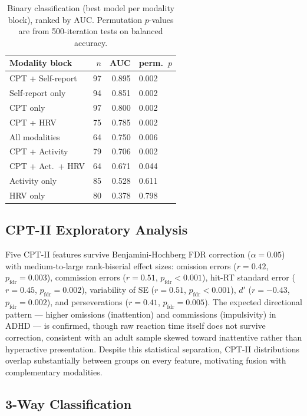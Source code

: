 \documentclass[11pt]{article}
\begin{document}
\begin{table}[t]
\centering
\small
\begin{tabular}{lrrl}
\toprule
\textbf{Modality block} & $n$ & \textbf{AUC} & \textbf{perm.\ $p$} \\
\midrule
CPT + Self-report      & 97 & 0.895 & 0.002 \\
Self-report only       & 94 & 0.851 & 0.002 \\
CPT only               & 97 & 0.800 & 0.002 \\
CPT + HRV              & 75 & 0.785 & 0.002 \\
All modalities         & 64 & 0.750 & 0.006 \\
CPT + Activity         & 79 & 0.706 & 0.002 \\
CPT + Act.\ + HRV      & 64 & 0.671 & 0.044 \\
Activity only          & 85 & 0.528 & 0.611 \\
HRV only               & 80 & 0.378 & 0.798 \\
\bottomrule
\end{tabular}
\caption{Binary classification (best model per modality block), ranked by AUC. Permutation $p$-values are from 500-iteration tests on balanced accuracy.}
\label{tab:binary}
\end{table}

\subsection{CPT-II Exploratory Analysis}

Five CPT-II features survive Benjamini-Hochberg FDR correction ($\alpha=0.05$) with medium-to-large rank-biserial effect sizes: omission errors ($r=0.42$, $p_{\text{fdr}}=0.003$), commission errors ($r=0.51$, $p_{\text{fdr}}<0.001$), hit-RT standard error ($r=0.45$, $p_{\text{fdr}}=0.002$), variability of SE ($r=0.51$, $p_{\text{fdr}}<0.001$), $d'$ ($r=-0.43$, $p_{\text{fdr}}=0.002$), and perseverations ($r=0.41$, $p_{\text{fdr}}=0.005$). The expected directional pattern --- higher omissions (inattention) and commissions (impulsivity) in ADHD --- is confirmed, though raw reaction time itself does not survive correction, consistent with an adult sample skewed toward inattentive rather than hyperactive presentation. Despite this statistical separation, CPT-II distributions overlap substantially between groups on every feature, motivating fusion with complementary modalities.

\subsection{3-Way Classification}
\end{document}
